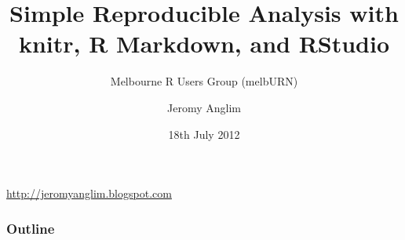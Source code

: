 \documentclass[t]{beamer}
\title{Simple Reproducible Analysis with knitr, R Markdown, and RStudio}
\subtitle{Melbourne R Users Group (melbURN)}
\author{Jeromy Anglim}
\institute{Melbourne Business School}
\date{18th July 2012}
\begin{document}
\begin{frame}
\titlepage
\begin{center}
	\url{http://jeromyanglim.blogspot.com}
\end{center}
\end{frame}

\begin{frame}
\frametitle{Outline}
\tableofcontents
\end{frame}


\end{document}
